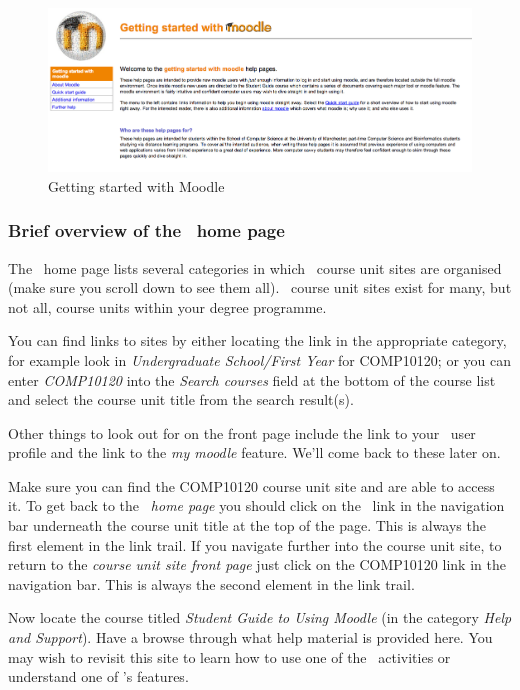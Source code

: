 \begin{figure}
\centerline{\includegraphics[width=15cm]{images/start-moodle-page}}
\caption{Getting started with Moodle}\label{figure:moodle-start}
\end{figure}

\subsubsection*{Brief overview of the \moodle\ home page}
\label{sec:brief-overv-moodle}


The \moodle\ home page lists several categories in which \moodle\ course unit sites are organised (make sure you scroll down to see them all). \moodle\ course unit sites exist for many, but not all, course units within your degree programme.

You can find links to sites by either locating the link in the appropriate category, for example look in \emph{Undergraduate School/First Year} for COMP10120; or you can enter \emph{COMP10120} into the \emph{Search courses} field at the bottom of the course list and select the course unit title from the search result(s).

Other things to look out for on the front page include the link to your \moodle\ user profile and the link to the \emph{my moodle} feature. We'll come back to these later on.




Make sure you can find the COMP10120 course unit site and are able to access it. To get back to the \emph{\moodle\ home page} you should click on the \moodle\ link in the navigation bar underneath the course unit title at the top of the page. This is always the first element in the link trail. If you navigate further into the course unit site, to return to the \emph{course unit site front page} just click on the COMP10120 link in the navigation bar. This is always the second element in the link trail.

Now locate the course titled \emph{Student Guide to Using Moodle} (in the category \emph{Help and Support}). Have a browse through what help material is provided here. You may wish to revisit this site to learn how to use one of the \moodle\ activities or understand one of \Moodle's features.

